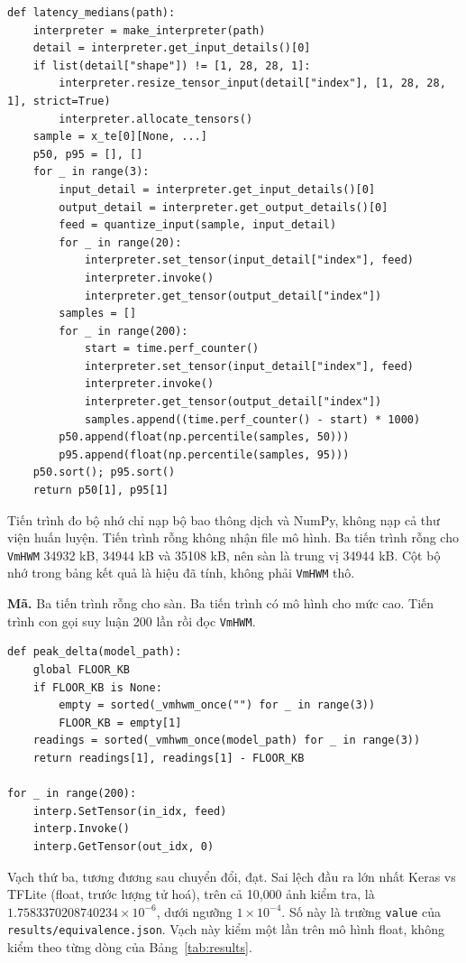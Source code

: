 \documentclass[13pt,a4paper]{article}
\begin{document}
\nopagebreak
{\fontsize{8}{9.2}\selectfont
\begin{verbatim}
def latency_medians(path):
    interpreter = make_interpreter(path)
    detail = interpreter.get_input_details()[0]
    if list(detail["shape"]) != [1, 28, 28, 1]:
        interpreter.resize_tensor_input(detail["index"], [1, 28, 28, 1], strict=True)
        interpreter.allocate_tensors()
    sample = x_te[0][None, ...]
    p50, p95 = [], []
    for _ in range(3):
        input_detail = interpreter.get_input_details()[0]
        output_detail = interpreter.get_output_details()[0]
        feed = quantize_input(sample, input_detail)
        for _ in range(20):
            interpreter.set_tensor(input_detail["index"], feed)
            interpreter.invoke()
            interpreter.get_tensor(output_detail["index"])
        samples = []
        for _ in range(200):
            start = time.perf_counter()
            interpreter.set_tensor(input_detail["index"], feed)
            interpreter.invoke()
            interpreter.get_tensor(output_detail["index"])
            samples.append((time.perf_counter() - start) * 1000)
        p50.append(float(np.percentile(samples, 50)))
        p95.append(float(np.percentile(samples, 95)))
    p50.sort(); p95.sort()
    return p50[1], p95[1]
\end{verbatim}
}

Tiến trình đo bộ nhớ chỉ nạp bộ bao thông dịch và NumPy, không nạp cả thư viện huấn luyện.
Tiến trình rỗng không nhận file mô hình.
Ba tiến trình rỗng cho \texttt{VmHWM} 34932 kB, 34944 kB và 35108 kB, nên sàn là trung vị 34944 kB.
Cột bộ nhớ trong bảng kết quả là hiệu đã tính, không phải \texttt{VmHWM} thô.

\noindent\textbf{Mã.}
Ba tiến trình rỗng cho sàn.
Ba tiến trình có mô hình cho mức cao.
Tiến trình con gọi suy luận 200 lần rồi đọc \texttt{VmHWM}.

\nopagebreak
{\fontsize{8}{9.2}\selectfont
\begin{verbatim}
def peak_delta(model_path):
    global FLOOR_KB
    if FLOOR_KB is None:
        empty = sorted(_vmhwm_once("") for _ in range(3))
        FLOOR_KB = empty[1]
    readings = sorted(_vmhwm_once(model_path) for _ in range(3))
    return readings[1], readings[1] - FLOOR_KB

for _ in range(200):
    interp.SetTensor(in_idx, feed)
    interp.Invoke()
    interp.GetTensor(out_idx, 0)
\end{verbatim}
}

Vạch thứ ba, tương đương sau chuyển đổi, đạt.
Sai lệch đầu ra lớn nhất Keras vs TFLite (float, trước lượng tử hoá), trên cả 10{,}000 ảnh kiểm tra, là \(1.7583370208740234\times 10^{-6}\), dưới ngưỡng \(1\times 10^{-4}\).
Số này là trường \texttt{value} của \texttt{results/equivalence.json}.
Vạch này kiểm một lần trên mô hình float, không kiểm theo từng dòng của Bảng~\ref{tab:results}.
\end{document}
